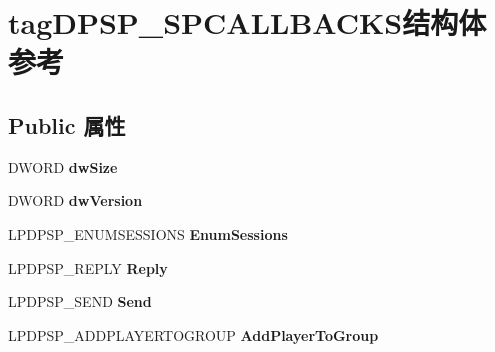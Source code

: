 \hypertarget{structtag_d_p_s_p___s_p_c_a_l_l_b_a_c_k_s}{}\section{tag\+D\+P\+S\+P\+\_\+\+S\+P\+C\+A\+L\+L\+B\+A\+C\+K\+S结构体 参考}
\label{structtag_d_p_s_p___s_p_c_a_l_l_b_a_c_k_s}
\subsection*{Public 属性}
\begin{DoxyCompactItemize}
\item 
\mbox{\label{structtag_d_p_s_p___s_p_c_a_l_l_b_a_c_k_s_aa4625d1aff4ece467e9db8fa76bf67c2}} 
D\+W\+O\+RD {\bfseries dw\+Size}
\item 
\mbox{\label{structtag_d_p_s_p___s_p_c_a_l_l_b_a_c_k_s_aeadaf72e223182d39abcf1e4d1527e72}} 
D\+W\+O\+RD {\bfseries dw\+Version}
\item 
\mbox{\label{structtag_d_p_s_p___s_p_c_a_l_l_b_a_c_k_s_a8d79c74585b0b8334ca9fb9c6f9911d9}} 
L\+P\+D\+P\+S\+P\+\_\+\+E\+N\+U\+M\+S\+E\+S\+S\+I\+O\+NS {\bfseries Enum\+Sessions}
\item 
\mbox{\label{structtag_d_p_s_p___s_p_c_a_l_l_b_a_c_k_s_ad1a5e2742da036837547a20356ff2c27}} 
L\+P\+D\+P\+S\+P\+\_\+\+R\+E\+P\+LY {\bfseries Reply}
\item 
\mbox{\label{structtag_d_p_s_p___s_p_c_a_l_l_b_a_c_k_s_a4b34e04ea787f9dad8077d8c39771f77}} 
L\+P\+D\+P\+S\+P\+\_\+\+S\+E\+ND {\bfseries Send}
\item 
\mbox{\label{structtag_d_p_s_p___s_p_c_a_l_l_b_a_c_k_s_ae30c129ee713d7445d73cc3bad783db5}} 
L\+P\+D\+P\+S\+P\+\_\+\+A\+D\+D\+P\+L\+A\+Y\+E\+R\+T\+O\+G\+R\+O\+UP {\bfseries Add\+Player\+To\+Group}
\item 
\mbox{\label{structtag_d_p_s_p___s_p_c_a_l_l_b_a_c_k_s_a7926f6d40421e3995ef5bafaaf64d834}} 

\end{DoxyCompactItemize}
